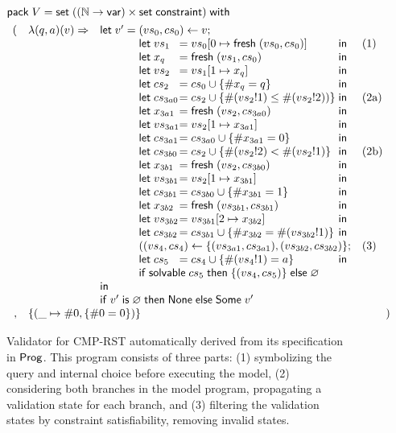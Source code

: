 \begin{figure}
\begin{align*}
&\existT{V}{\Set((\Nat\to\Var)\times\Set\constraint)}\\
  &\begin{array}{rll}
     (&\lam{(q,a)(v)}{&\llet v'=\begin{array}[t]{@{}l@{}l@{}ll}
       \multicolumn{3}{@{}l}{(vs_0,cs_0)\gets v;}\\
       \letin{vs_1&}{\update{vs_0}{0}{\Fresh (vs_0,cs_0)}&}&\text{(1)}\\
       \letin{x_q&}{\Fresh (vs_1,cs_0)&}\\
       \letin{vs_2&}{\update{vs_1}{1}{x_q}&}\\
       \letin{cs_2&}{cs_0\cup\{\#x_q= q\}&}\\
       \letin{cs_{3a0}&}{cs_2\cup\{\#(vs_2!1)\le\#(vs_2!2))\}&}&\text{(2a)}\\
       \letin{x_{3a1}&}{\Fresh (vs_2,cs_{3a0})&}\\
       \letin{vs_{3a1}&}{\update{vs_2}{1}{x_{3a1}}&}\\
       \letin{cs_{3a1}&}{cs_{3a0}\cup\{\#x_{3a1}=0\}&}\\
       \letin{cs_{3b0}&}{cs_2\cup\{\#(vs_2!2)<\#(vs_2!1)\}&}&\text{(2b)}\\
       \letin{x_{3b1}&}{\Fresh (vs_2,cs_{3b0})&}\\
       \letin{vs_{3b1}&}{\update{vs_2}{1}{x_{3b1}}&}\\
       \letin{cs_{3b1}&}{cs_{3b0}\cup\{\#x_{3b1}=1\}&}\\
       \letin{x_{3b2}&}{\Fresh (vs_{3b1},cs_{3b1})&}\\
       \letin{vs_{3b2}&}{\update{vs_{3b1}}{2}{x_{3b2}}&}\\
       \letin{cs_{3b2}&}{cs_{3b1}\cup\{\#x_{3b2}=\#(vs_{3b2}!1)\}&}\\
       \multicolumn{3}{@{}l}{((vs_4,cs_4)\gets\{(vs_{3a1},cs_{3a1}),(vs_{3b2},cs_{3b2})\};}&\text{(3)}\\
       \letin{cs_5&}{cs_4\cup\{\#(vs_4!1)= a\}&}\\
       \multicolumn{3}{@{}l}{\If\solvable cs_5\Then\{(vs_4,cs_5)\}\Else\varnothing}\\
       \end{array}\\
       &&\iin\\
       &&\If v'\Is\varnothing\Then\None\Else\Some v'
     }\\
     ,&\multicolumn{2}{l}{\{(\_\mapsto\#0,\{\#0=0\})\}})
   \end{array}
\end{align*}
\caption[Validator for protocol CMP-RST]{Validator for CMP-RST automatically
  derived from its specification in $\mathsf{Prog}$.  This program consists of three
  parts: (1) symbolizing the query and internal choice before executing the
  model, (2) considering both branches in the model program, propagating a
  validation state for each branch, and (3) filtering the validation states by
  constraint satisfiability, removing invalid states.}
\label{fig:derived-validator}
\end{figure}


